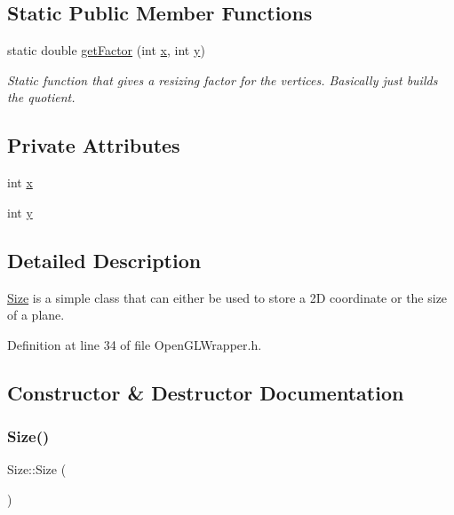 \subsection*{Static Public Member Functions}
\begin{DoxyCompactItemize}
\item 
static double \mbox{\hyperlink{classSize_a1f0f20fa0d81274342165fce2355ab63}{get\+Factor}} (int \mbox{\hyperlink{classSize_ab08283a0a20dc6c8659a10896bf1ad1f}{x}}, int \mbox{\hyperlink{classSize_aaee100979a10f98dacb8fa81c8bcc030}{y}})
\begin{DoxyCompactList}\small\item\em Static function that gives a resizing factor for the vertices. Basically just builds the quotient. \end{DoxyCompactList}\end{DoxyCompactItemize}
\subsection*{Private Attributes}
\begin{DoxyCompactItemize}
\item 
int \mbox{\hyperlink{classSize_ab08283a0a20dc6c8659a10896bf1ad1f}{x}}
\item 
int \mbox{\hyperlink{classSize_aaee100979a10f98dacb8fa81c8bcc030}{y}}
\end{DoxyCompactItemize}


\subsection{Detailed Description}
\mbox{\hyperlink{classSize}{Size}} is a simple class that can either be used to store a 2D coordinate or the size of a plane. 

Definition at line 34 of file Open\+G\+L\+Wrapper.\+h.



\subsection{Constructor \& Destructor Documentation}
\mbox{\label{classSize_a05347a96b95d4b93dbe51d159c40c8db}} 
\subsubsection{\texorpdfstring{Size()}{Size()}\hspace{0.1cm}{\footnotesize\ttfamily [1/3]}}
{\footnotesize\ttfamily Size\+::\+Size (\begin{DoxyParamCaption}{ }\end{DoxyParamCaption})}



